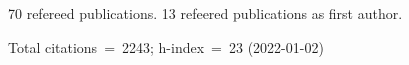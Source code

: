 70 refereed publications. 13 refeered publications as first author.

Total citations~=~2243; h-index~=~23 (2022-01-02)